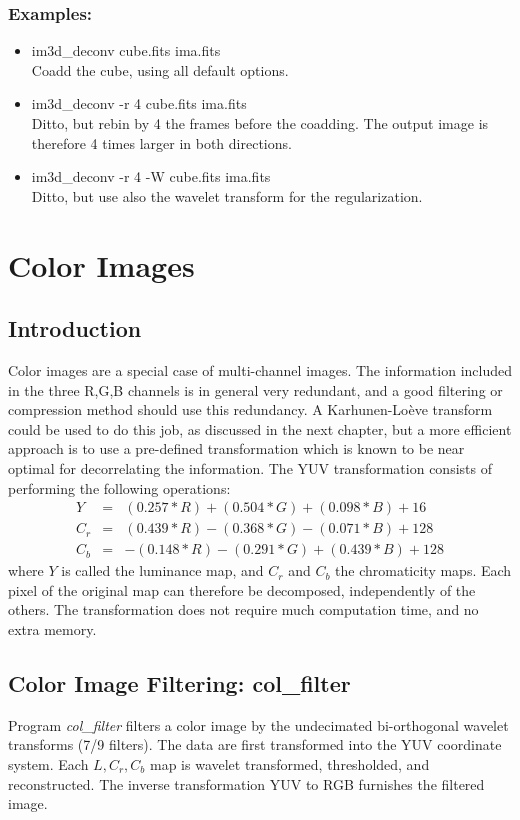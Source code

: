 \subsubsection*{Examples:}
\begin{itemize}
\baselineskip=0.4truecm
\itemsep=0.1truecm
\item im3d\_deconv cube.fits ima.fits \\
Coadd the cube, using all default options.
\item im3d\_deconv -r 4 cube.fits ima.fits\\
Ditto, but rebin by 4 the frames before the coadding. The output image
is therefore 4 times larger in both directions.
\item im3d\_deconv -r 4 -W cube.fits ima.fits\\
Ditto, but use also the wavelet transform for the regularization.
\end{itemize}


\section{Color Images}
\subsection{Introduction}
Color images are a special case of multi-channel images. The information
included in the three R,G,B channels is in general very redundant, and a
good filtering or compression method should use this redundancy. 
A Karhunen-Lo\`eve transform could be used to do this job, as discussed in
the next chapter, but a more efficient approach is to use a pre-defined 
transformation which is known to be near optimal for decorrelating
the information. The YUV transformation consists of performing the following
operations: 
\begin{eqnarray}
   Y  & = & (0.257 * R) + (0.504 * G) + (0.098 * B) + 16  \nonumber \\
   C_r & = &(0.439 * R) - (0.368 * G) - (0.071 * B) + 128 \nonumber \\
   C_b & = & -(0.148 * R) - (0.291 * G) + (0.439 * B) + 128
\end{eqnarray}
where $Y$ is called the luminance map, and $C_r$ and $C_b$ the chromaticity maps. Each pixel of the original map can therefore be decomposed, independently
of the others. The transformation does not require much computation time,
and no extra memory.

\subsection{Color Image Filtering: col\_filter}
Program {\em col\_filter} filters a
color image by the undecimated bi-orthogonal wavelet 
transforms (7/9 filters). The data are first transformed into 
the YUV coordinate system. Each $L,C_r,C_b$ map is 
wavelet transformed, thresholded, and reconstructed. 
The inverse transformation
YUV to RGB furnishes the filtered image.

